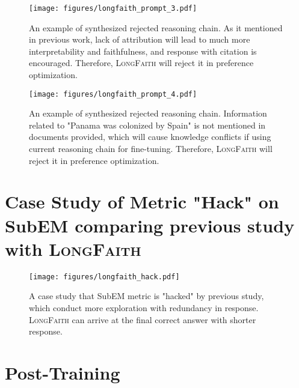 \begin{figure}[ht]
    \centering
    \centerline{\texttt{[image: figures/longfaith\_prompt\_3.pdf]}}
    \vspace{-5pt}
    \caption{An example of synthesized rejected reasoning chain. As it mentioned in previous work, lack of attribution will lead to much more interpretability and faithfulness, and response with citation is encouraged. Therefore, \textsc{LongFaith} will reject it in preference optimization.}
    \label{fig:pt_3}
    \vspace{-10pt}
\end{figure}

\begin{figure}[ht]
    \centering
    \centerline{\texttt{[image: figures/longfaith\_prompt\_4.pdf]}}
    \vspace{-5pt}
    \caption{An example of synthesized rejected reasoning chain. Information related to "Panama was colonized by Spain" is not mentioned in documents provided, which will cause knowledge conflicts if using current reasoning chain for fine-tuning. Therefore, \textsc{LongFaith} will reject it in preference optimization.}
    \label{fig:pt_4}
    \vspace{-10pt}
\end{figure}

\clearpage

\section{Case Study of Metric "Hack" on SubEM comparing previous study with \textsc{LongFaith}}

\begin{figure}[ht]
    \centering
    \centerline{\texttt{[image: figures/longfaith\_hack.pdf]}}
    \vspace{-5pt}
    \caption{A case study that SubEM metric is "hacked" by previous study, which conduct more exploration with redundancy in response. \textsc{LongFaith} can arrive at the final correct answer with shorter response.}
    \label{fig:hack}
    \vspace{-10pt}
\end{figure}

\clearpage

\section{Post-Training}
\label{sec:method:post}

